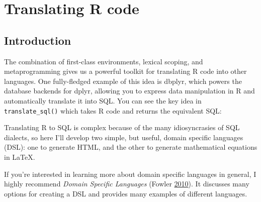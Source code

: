 \documentclass[]{book}
\newenvironment{Shaded}{\begin{snugshade}}{\end{snugshade}}
\newcommand{\CommentTok}[1]{\textcolor[rgb]{0.37,0.37,0.37}{\textit{#1}}}
\newcommand{\DecValTok}[1]{\textcolor[rgb]{0.06,0.06,0.06}{#1}}
\newcommand{\KeywordTok}[1]{\textcolor[rgb]{0.27,0.27,0.27}{\textbf{#1}}}
\newcommand{\NormalTok}[1]{#1}
\newcommand{\OperatorTok}[1]{\textcolor[rgb]{0.43,0.43,0.43}{\textbf{#1}}}
\newcommand{\StringTok}[1]{\textcolor[rgb]{0.5,0.5,0.5}{#1}}
\begin{document}
\hypertarget{translation}{%
\chapter{Translating R code}\label{translation}}

\hypertarget{introduction-5}{%
\section{Introduction}\label{introduction-5}}

The combination of first-class environments, lexical scoping, and metaprogramming gives us a powerful toolkit for translating R code into other languages. One fully-fledged example of this idea is dbplyr, which powers the database backends for dplyr, allowing you to express data manipulation in R and automatically translate it into SQL. You can see the key idea in \texttt{translate\_sql()} which takes R code and returns the equivalent SQL:

\begin{Shaded}
\end{Shaded}

Translating R to SQL is complex because of the many idiosyncrasies of SQL dialects, so here I'll develop two simple, but useful, domain specific languages (DSL): one to generate HTML, and the other to generate mathematical equations in LaTeX.

If you're interested in learning more about domain specific languages in general, I highly recommend \emph{Domain Specific Languages} (Fowler \protect\hyperlink{ref-dsls}{2010}). It discusses many options for creating a DSL and provides many examples of different languages.
\end{document}
